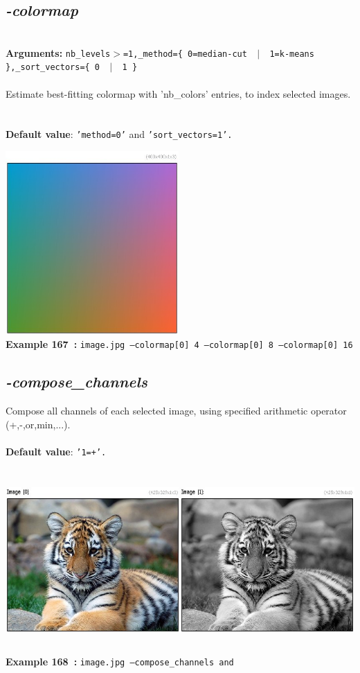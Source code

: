 \documentclass[a4paper,11pt,twoside]{book}
\begin{document}
\subsection{\emph{-colormap} }\vspace*{-0.5em}
~\\\textbf{Arguments: } 
{\small \texttt{nb\_levels$>$=1,\_method=\{ 0=median-cut ~$|$~ 1=k-means \},\_sort\_vectors=\{ 0 ~$|$~ 1 \}}}\\~\\
Estimate best-fitting colormap with 'nb\_colors' entries, to index selected images.
~\\~\\\textbf{Default value}: {\small \texttt{'method=0'} and \texttt{'sort\_vectors=1'.}}
\begin{center}\includegraphics[keepaspectratio=true,height=7cm,width=\textwidth]{img/gmic_def167.jpg}\\
{\footnotesize \textbf{Example 167~:} \texttt{image.jpg --colormap[0] 4 --colormap[0] 8 --colormap[0] 16}}
\end{center}

\subsection{\emph{-compose\_channels} }\vspace*{-0.5em}
Compose all channels of each selected image, using specified arithmetic operator (+,-,or,min,...).
~\\~\\\textbf{Default value}: {\small \texttt{'1=+'.}}
\begin{center}\includegraphics[keepaspectratio=true,height=7cm,width=\textwidth]{img/gmic_def168.jpg}\\
{\footnotesize \textbf{Example 168~:} \texttt{image.jpg --compose\_channels and}}
\end{center}
\end{document}
